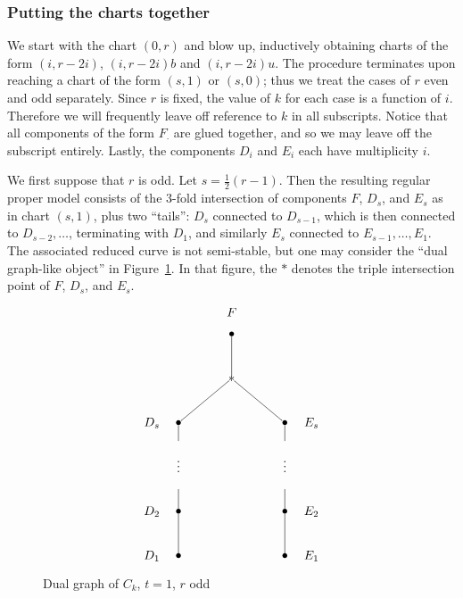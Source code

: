 \documentclass[reqno]{amsart}
\theoremstyle{definition}
\theoremstyle{remark}
\begin{document}
\subsubsection{Putting the charts together}
\label{sec:putt-charts-togeth}

We start with the chart $(0, r)$ and blow up, inductively obtaining charts of the form $(i, r-2i)$, $(i, r-2i)b$ and $(i, r-2i)u$. The procedure terminates upon reaching a chart of the form $(s, 1)$ or $(s, 0)$; thus we treat the cases of $r$ even and odd separately. Since $r$ is fixed, the value of $k$ for each case is a function of $i$. Therefore we will frequently leave off reference to $k$ in all subscripts. Notice that all components of the form $F_{\cdot}$ are glued together, and so we may leave off the subscript entirely. Lastly, the components $D_i$ and $E_i$ each have multiplicity $i$.

We first suppose that $r$ is odd. Let $s = \frac12(r-1)$. Then the resulting regular proper model consists of the 3-fold intersection of components $F$, $D_s$, and $E_s$ as in chart $(s, 1)$, plus two ``tails'': $D_s$ connected to $D_{s-1}$, which is then connected to $D_{s-2}, \dots$, terminating with $D_1$, and similarly $E_s$ connected to $E_{s-1}, \dots, E_1$. The associated reduced curve is not semi-stable, but one may consider the ``dual graph-like object'' in Figure~\ref{fig:superelliptic-dual-graph-odd}. In that figure, the $\ast$ denotes the triple intersection point of $F$, $D_{s}$, and $E_{s}$.
\begin{figure}[h]\centering
  \[
\xygraph{
  !{<0cm,0cm>;<1.5cm,0cm>:<0cm,1.25cm>::}
  !{(2,5.5) }*{F}
  !{(2,5) }*{\bullet}="f"
  !{(2,4) }*{\ast}="triple"
  !{(.5,3) }*{D_{s}}
  !{(1,3) }*{\bullet}="ds"
  !{(1,2.6) }*{}="dabove"
  !{(1,2.1) }*{\vdots}="dspace"
  !{(1,1.5) }*{}="dbelow"
  !{(1,1) }*{\bullet}="d2"
  !{(.5,1) }*{D_2}
  !{(1,0) }*{\bullet}="d1"
  !{(.5,0) }*{D_1}
  !{(3.5,3) }*{E_{s}}
  !{(3,3) }*{\bullet}="es"
  !{(3,2.6) }*{}="eabove"
  !{(3,2.1) }*{\vdots}="espace"
  !{(3,1.5) }*{}="ebelow"
  !{(3,1) }*{\bullet}="e2"
  !{(3.5,1) }*{E_2}
  !{(3,0) }*{\bullet}="e1"
  !{(3.5,0) }*{E_1}
  "f"-"triple"
  "triple"-"ds"
  "ds"-"dabove"
  "dbelow"-"d2"
  "d2"-"d1"
  "triple"-"es"
  "es"-"eabove"
  "ebelow"-"e2"
  "e2"-"e1"
}
\]
  \caption{Dual graph of $C_k$, $t=1$, $r$ odd}
\label{fig:superelliptic-dual-graph-odd}
\end{figure}
\end{document}
